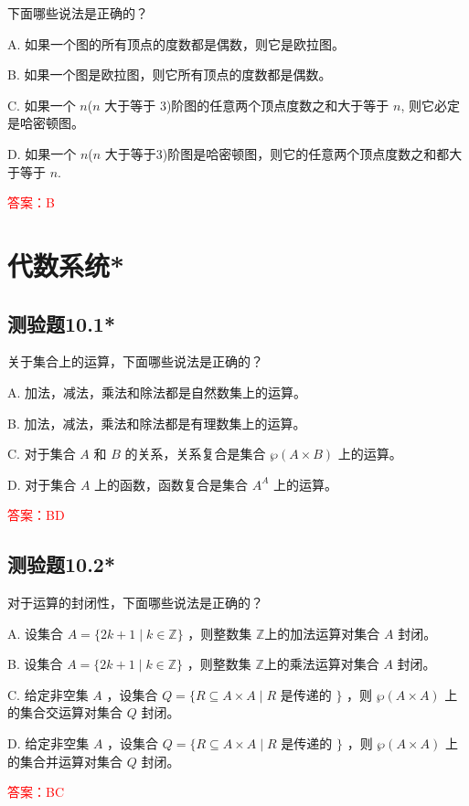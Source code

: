 \documentclass[UTF8, heading=true]{ctexart}
\begin{document}
下面哪些说法是正确的？

A. 
如果一个图的所有顶点的度数都是偶数，则它是欧拉图。

B. 
如果一个图是欧拉图，则它所有顶点的度数都是偶数。

C. 
如果一个 $n$($n$ 大于等于 3)阶图的任意两个顶点度数之和大于等于 $n$, 则它必定是哈密顿图。

D. 
如果一个 $n$($n$ 大于等于3)阶图是哈密顿图，则它的任意两个顶点度数之和都大于等于 $n$.

\textcolor{red}{答案：B}

\clearpage

\section{代数系统*}

\subsection{测验题10.1*}

关于集合上的运算，下面哪些说法是正确的？

A. 加法，减法，乘法和除法都是自然数集上的运算。

B. 加法，减法，乘法和除法都是有理数集上的运算。

C. 对于集合 $A$ 和 $B$ 的关系，关系复合是集合 $\wp(A \times B)$ 上的运算。

D. 对于集合 $A$ 上的函数，函数复合是集合 $A^A$ 上的运算。

\textcolor{red}{答案：BD}

\subsection{测验题10.2*}

对于运算的封闭性，下面哪些说法是正确的？

A. 设集合 $A=\{2 k+1 \mid k \in \mathbb{Z}\}$ ，则整数集 $\mathbb{Z} $上的加法运算对集合 $A$ 封闭。

B. 设集合 $A=\{2 k+1 \mid k \in \mathbb{Z}\}$ ，则整数集 $\mathbb{Z} $上的乘法运算对集合 $A$ 封闭。

C. 给定非空集 $A$ ，设集合 $Q=\{R \subseteq A \times A \mid R$ 是传递的 $\}$ ，则 $\wp(A \times A)$ 上的集合交运算对集合 $Q$ 封闭。

D. 给定非空集 $A$ ，设集合 $Q=\{R \subseteq A \times A \mid R$ 是传递的 $\}$ ，则 $\wp(A \times A)$ 上的集合并运算对集合 $Q$ 封闭。


\textcolor{red}{答案：BC}
\end{document}
